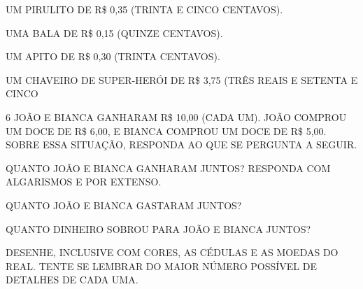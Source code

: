 \begin{escolha}
\item UM PIRULITO DE R\$ 0,35 (TRINTA E CINCO CENTAVOS).


\item UMA BALA DE R\$ 0,15 (QUINZE CENTAVOS).


\item UM APITO DE R\$ 0,30 (TRINTA CENTAVOS).


\item UM CHAVEIRO DE SUPER-HERÓI DE R\$ 3,75 (TRÊS REAIS E SETENTA E CINCO

\end{escolha}


\num{6} JOÃO E BIANCA GANHARAM R\$ 10,00 (CADA UM). JOÃO COMPROU UM DOCE DE R\$ 6,00,
E BIANCA COMPROU UM DOCE DE R\$ 5,00. SOBRE ESSA SITUAÇÃO, RESPONDA AO QUE SE PERGUNTA A SEGUIR.

\begin{escolha}
\item QUANTO JOÃO E BIANCA GANHARAM JUNTOS? RESPONDA COM ALGARISMOS E POR EXTENSO.


\item QUANTO JOÃO E BIANCA GASTARAM JUNTOS?


\item QUANTO DINHEIRO SOBROU PARA JOÃO E BIANCA JUNTOS?


\item DESENHE, INCLUSIVE COM CORES, AS CÉDULAS E AS MOEDAS DO REAL. TENTE SE LEMBRAR DO MAIOR NÚMERO POSSÍVEL DE DETALHES DE CADA UMA.

\end{escolha}



